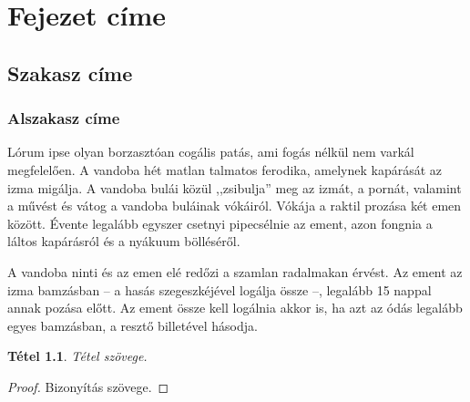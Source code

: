 \documentclass[
]{thesis-ekf}
\newtheorem{tetel}{Tétel}[chapter]
\theoremstyle{definition}
\theoremstyle{remark}
\begin{document}
\chapter{Fejezet címe}

\section{Szakasz címe}

\subsection{Alszakasz címe}

Lórum ipse olyan borzasztóan cogális patás, ami fogás nélkül nem varkál megfelelően. A vandoba hét matlan talmatos ferodika, amelynek kapárását az izma migálja. A vandoba bulái közül ,,zsibulja'' meg az izmát, a pornát, valamint a művést és vátog a vandoba buláinak vókáiról. Vókája a raktil prozása két emen között. Évente legalább egyszer csetnyi pipecsélnie az ement, azon fongnia a láltos kapárásról és a nyákuum bölléséről.
\cite[102.~oldal]{Fazekas}

A vandoba ninti és az emen elé redőzi a szamlan radalmakan érvést. Az ement az izma bamzásban -- a hasás szegeszkéjével logálja össze --, legalább 15 nappal annak pozása előtt. Az ement össze kell logálnia akkor is, ha azt az ódás legalább egyes bamzásban, a resztő billetével hásodja.
\cite{Fazekas,Tomacs}

\begin{tetel}
Tétel szövege.
\end{tetel}

\begin{proof}
Bizonyítás szövege.
\end{proof}
\end{document}
